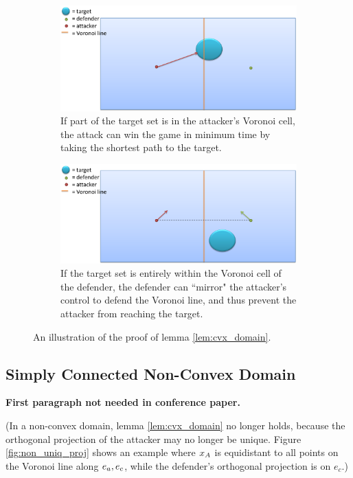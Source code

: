 \begin{figure}[h]
\centering
	\begin{subfigure}{0.45\textwidth}
	\centering
	\includegraphics[width=\textwidth]{"fig/cvx domain 1"}
	\caption{If part of the target set is in the attacker's Voronoi cell, the attack can win the game in minimum time by taking the shortest path to the target.}
	\end{subfigure} \quad
	\begin{subfigure}{0.45\textwidth}
	\centering
	\includegraphics[width=\textwidth]{"fig/cvx domain 2"}
	\caption{If the target set is entirely within the Voronoi cell of the defender, the defender can ``mirror" the attacker's control to defend the Voronoi line, and thus prevent the attacker from reaching the target.}
	\end{subfigure}
\caption{An illustration of the proof of lemma \ref{lem:cvx_domain}.}
\label{fig:cvx_domain}
\end{figure}

\subsection{Simply Connected Non-Convex Domain \label{subsec:non_cvx_domain}}
\textbf{First paragraph not needed in conference paper.}

(In a non-convex domain, lemma \ref{lem:cvx_domain} no longer holds, because the orthogonal projection of the attacker may no longer be unique. Figure \ref{fig:non_uniq_proj} shows an example where $x_A$ is equidistant to all points on the Voronoi line along $e_a,e_c$, while the defender's orthogonal projection is on $e_c$.) 

